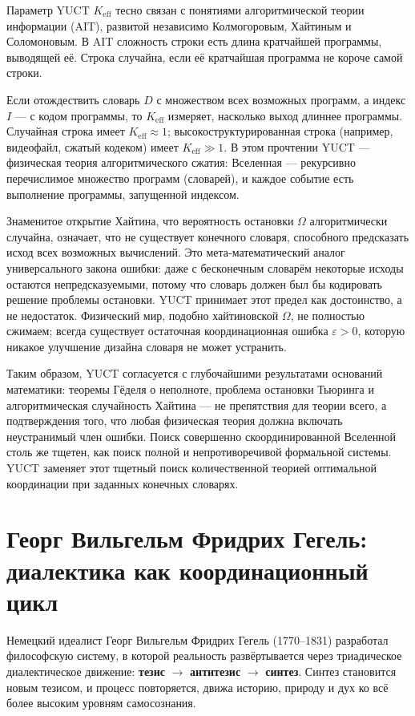 \documentclass[12pt,a4paper]{article}
\begin{document}
	Параметр YUCT \(K_{\mathrm{eff}}\) тесно связан с понятиями алгоритмической теории информации (AIT), развитой независимо Колмогоровым, Хайтиным и Соломоновым. В AIT сложность строки есть длина кратчайшей программы, выводящей её. Строка случайна, если её кратчайшая программа не короче самой строки.
	
	Если отождествить словарь \(D\) с множеством всех возможных программ, а индекс \(I\) — с кодом программы, то \(K_{\mathrm{eff}}\) измеряет, насколько выход длиннее программы. Случайная строка имеет \(K_{\mathrm{eff}} \approx 1\); высокоструктурированная строка (например, видеофайл, сжатый кодеком) имеет \(K_{\mathrm{eff}} \gg 1\). В этом прочтении YUCT — физическая теория алгоритмического сжатия: Вселенная — рекурсивно перечислимое множество программ (словарей), и каждое событие есть выполнение программы, запущенной индексом.
	
	Знаменитое открытие Хайтина, что вероятность остановки \(\Omega\) алгоритмически случайна, означает, что не существует конечного словаря, способного предсказать исход всех возможных вычислений. Это мета‑математический аналог универсального закона ошибки: даже с бесконечным словарём некоторые исходы остаются непредсказуемыми, потому что словарь должен был бы кодировать решение проблемы остановки. YUCT принимает этот предел как достоинство, а не недостаток. Физический мир, подобно хайтиновской \(\Omega\), не полностью сжимаем; всегда существует остаточная координационная ошибка \(\varepsilon > 0\), которую никакое улучшение дизайна словаря не может устранить.
	
	Таким образом, YUCT согласуется с глубочайшими результатами оснований математики: теоремы Гёделя о неполноте, проблема остановки Тьюринга и алгоритмическая случайность Хайтина — не препятствия для теории всего, а подтверждения того, что любая физическая теория должна включать неустранимый член ошибки. Поиск совершенно скоординированной Вселенной столь же тщетен, как поиск полной и непротиворечивой формальной системы. YUCT заменяет этот тщетный поиск количественной теорией оптимальной координации при заданных конечных словарях.
	
	\section{Георг Вильгельм Фридрих Гегель: диалектика как координационный цикл}
	
	Немецкий идеалист Георг Вильгельм Фридрих Гегель (1770–1831) разработал философскую систему, в которой реальность развёртывается через триадическое диалектическое движение: \textbf{тезис} \(\to\) \textbf{антитезис} \(\to\) \textbf{синтез}. Синтез становится новым тезисом, и процесс повторяется, движа историю, природу и дух ко всё более высоким уровням самосознания.
	
\end{document}
